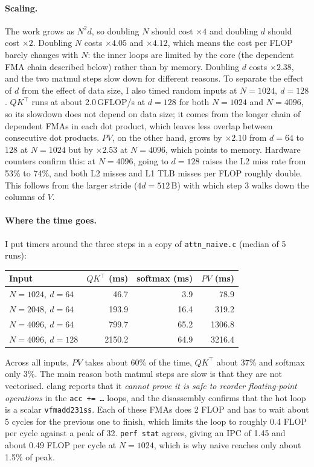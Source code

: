 \documentclass[11pt,a4paper]{article}
\begin{document}
\paragraph{Scaling.} The work grows as $N^2d$, so doubling $N$ should cost $\times4$ and
doubling $d$ should cost $\times2$. Doubling $N$ costs $\times4.05$ and $\times4.12$, which means
the cost per FLOP barely changes with $N$: the inner loops are limited by the core (the
dependent FMA chain described below) rather than by memory. Doubling $d$ costs $\times2.38$, and
the two matmul steps slow down for different reasons. To separate the effect of $d$ from the
effect of data size, I also timed random inputs at $N=1024,\ d=128$. $QK^\top$ runs at about
2.0\,GFLOP/s at $d=128$ for both $N=1024$ and $N=4096$, so its slowdown does not depend on data
size; it comes from the longer chain of dependent FMAs in each dot product, which leaves less
overlap between consecutive dot products. $PV$, on the other hand, grows by $\times2.10$ from
$d=64$ to $128$ at $N=1024$ but by $\times2.53$ at $N=4096$, which points to memory. Hardware
counters confirm this: at $N=4096$, going to $d=128$ raises the L2 miss rate from 53\% to 74\%,
and both L2 misses and L1 TLB misses per FLOP roughly double. This follows from the larger
stride ($4d = 512$\,B) with which step 3 walks down the columns of $V$.

\paragraph{Where the time goes.} I put timers around the three steps in a copy of
\texttt{attn\_naive.c} (median of 5 runs):

\begin{center}
\begin{tabular}{@{}lrrr@{}}
\toprule
Input & $QK^\top$ (ms) & softmax (ms) & $PV$ (ms) \\
\midrule
$N=1024,\ d=64$  & 46.7   & 3.9  & 78.9   \\
$N=2048,\ d=64$  & 193.9  & 16.4 & 319.2  \\
$N=4096,\ d=64$  & 799.7  & 65.2 & 1306.8 \\
$N=4096,\ d=128$ & 2150.2 & 64.9 & 3216.4 \\
\bottomrule
\end{tabular}
\end{center}

\noindent Across all inputs, $PV$ takes about 60\% of the time, $QK^\top$ about 37\% and softmax
only 3\%. The main reason both matmul steps are slow is that they are not vectorised. clang
reports that it \emph{cannot prove it is safe to reorder floating-point operations} in the
\texttt{acc += \dots} loops, and the disassembly confirms that the hot loop is a scalar
\texttt{vfmadd231ss}. Each of these FMAs does 2 FLOP and has to wait about 5 cycles for the
previous one to finish, which limits the loop to roughly 0.4 FLOP per cycle against a peak of 32.
\texttt{perf stat} agrees, giving an IPC of 1.45 and about 0.49 FLOP per cycle at $N=1024$,
which is why naive reaches only about 1.5\% of peak.
\end{document}
